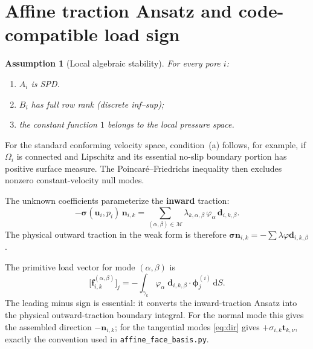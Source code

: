 \documentclass[11pt,a4paper]{article}
\newtheorem{assumption}{Assumption}
\newcommand{\pore}[1]{\Omega_{#1}}
\newcommand{\iface}{\gamma}
\newcommand{\vel}{\bm{u}}
\newcommand{\pres}{p}
\newcommand{\stress}{\bm{\sigma}}
\newcommand{\normal}{\bm{n}}
\newcommand{\modeset}{\mathcal{M}}
\newcommand{\loadvec}{\bm{f}}
\begin{document}
\section{Affine traction Ansatz and code-compatible load sign}

\begin{assumption}[Local algebraic stability]\label{ass:local}
  For every pore $i$:
  \begin{enumerate}[label=(\alph*),nosep,leftmargin=*]
    \item $A_i$ is SPD.
    \item $B_i$ has full row rank (discrete inf--sup);
    \item the constant function $1$ belongs to the local pressure space.
  \end{enumerate}
\end{assumption}

For the standard conforming velocity space, condition~(a) follows, for
example, if $\pore{i}$ is connected and Lipschitz and its essential
no-slip boundary portion has positive surface measure.  The
Poincar\'e--Friedrichs inequality then excludes nonzero
constant-velocity null modes.

The unknown coefficients parameterize the \textbf{inward} traction:
\begin{equation}\label{eq:traction}
  -\stress(\vel_i,\pres_i)\,\normal_{i,k}
  = \sum_{(\alpha,\beta)\in\modeset}
    \lambda_{k,\alpha,\beta}\,\varphi_\alpha\,\bm{d}_{i,k,\beta}.
\end{equation}
The physical outward traction in the weak form is therefore
$\stress\normal_{i,k} = -\sum \lambda\varphi\bm{d}_{i,k,\beta}$.

The primitive load vector for mode $(\alpha,\beta)$ is
\begin{equation}\label{eq:load}
  \bigl[\loadvec_{i,k}^{(\alpha,\beta)}\bigr]_j
  = -\int_{\iface_k} \varphi_\alpha\;
    \bm{d}_{i,k,\beta}\cdot\bm{\phi}_j^{(i)}\,\mathrm{d}S.
\end{equation}
The leading minus sign is essential: it converts the inward-traction
Ansatz into the physical outward-traction boundary integral.
For the normal mode this gives the assembled direction $-\normal_{i,k}$;
for the tangential modes \eqref{eq:dir} gives $+\sigma_{i,k}\bm{t}_{k,\nu}$,
exactly the convention used in \texttt{affine\_face\_basis.py}.
\end{document}
